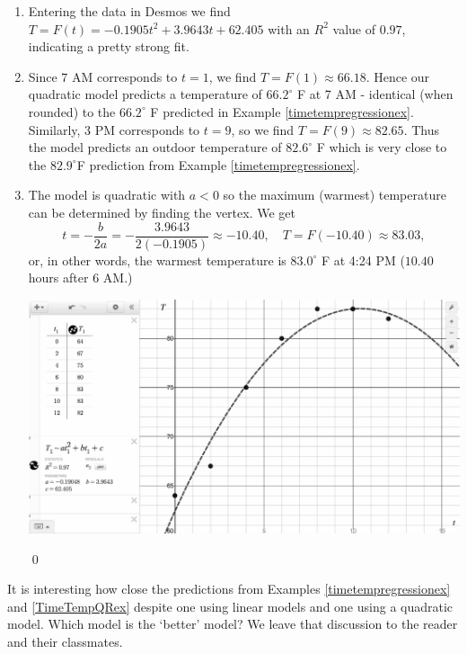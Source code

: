 {\begin{ex}
\begin{enumerate}
\item Entering the data in Desmos we find  $T = F(t)  = -0.1905t^2+ 3.9643t+62.405$ with an $R^2$ value of $0.97$, indicating a pretty strong fit.  

\item Since $7$ AM corresponds to $t=1$, we find $T = F(1) \approx 66.18$.   Hence our quadratic model predicts a temperature of  $66.2^{\circ}$ F at 7 AM - identical (when rounded) to the  $66.2^{\circ}$ F predicted in Example \ref{timetempregressionex}.  Similarly, $3$ PM corresponds to $t = 9$, so we find  $T = F(9) \approx 82.65$.  Thus the model predicts an outdoor temperature of $82.6^{\circ}$ F which is very close to the $82.9^{\circ}$F prediction from Example \ref{timetempregressionex}.

\item The model is quadratic with $a<0$ so the maximum (warmest) temperature can be determined by finding the vertex.  We get \[ t = -\dfrac{b}{2a} = - \dfrac{3.9643}{2( -0.1905)}  \approx -10.40, \quad T = F(-10.40) \approx 83.03,\] or, in other words, the warmest temperature is $83.0^{\circ}$ F at 4:24 PM ($10.40$ hours after 6 AM.)

\begin{center}

 \includegraphics[width=5in]{./QuadraticFunctionsGraphics/TimeTempDataQR.jpg}
 
 \end{center}
 
 \qed
 
 \end{enumerate}
 
 \end{ex}

It is interesting how close the predictions from  Examples \ref{timetempregressionex} and  \ref{TimeTempQRex} despite one using linear models and one using a quadratic model.  Which model is the `better' model?  We leave that discussion to the reader and their classmates.

\medskip
}

